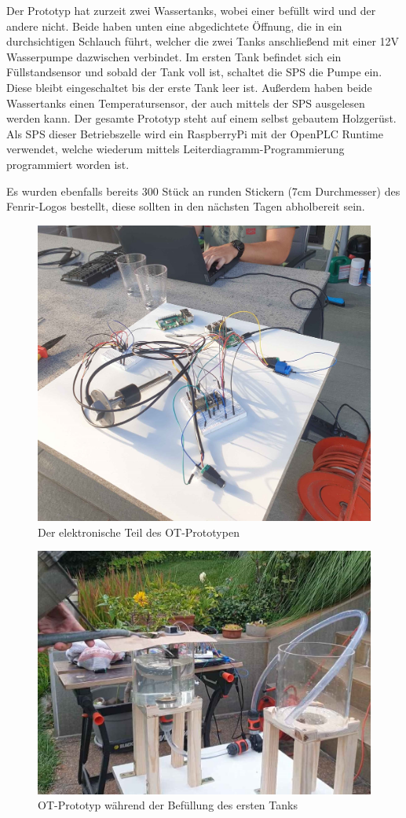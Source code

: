 \documentclass[
	headings=optiontotocandhead,%
	oneside,
	numbers=noenddot,%
	toc=flat, %
	10pt, %
	parskip=full, %
	listof=totoc, %
	listof=flat, %
	numbers=noenddot, %
	bibliography=totoc, %
	a4paper,DIV=14,
]{scrartcl}
\begin{document}
Der Prototyp hat zurzeit zwei Wassertanks, wobei einer befüllt wird und der andere nicht. Beide haben unten eine abgedichtete Öffnung, die in ein durchsichtigen Schlauch führt, welcher die zwei Tanks anschließend mit einer 12V Wasserpumpe dazwischen verbindet. Im ersten Tank befindet sich ein Füllstandsensor und sobald der Tank voll ist, schaltet die SPS die Pumpe ein. Diese bleibt eingeschaltet bis der erste Tank leer ist. Außerdem haben beide Wassertanks einen Temperatursensor, der auch mittels der SPS ausgelesen werden kann. Der gesamte Prototyp steht auf einem selbst gebautem Holzgerüst. Als SPS dieser Betriebszelle wird ein RaspberryPi mit der OpenPLC Runtime verwendet, welche wiederum mittels Leiterdiagramm-Programmierung programmiert worden ist.

Es wurden ebenfalls bereits 300 Stück an runden Stickern (7cm Durchmesser) des Fenrir-Logos bestellt, diese sollten in den nächsten Tagen abholbereit sein.

\begin{figure}[h]
	\centering
	\includegraphics[width=0.6\linewidth]{20240910_1}
	\caption[]{Der elektronische Teil des OT-Prototypen}
\end{figure}
\FloatBarrier 

\begin{figure}[h]
	\centering
	\includegraphics[width=0.6\linewidth]{20240910_2}
	\caption[]{OT-Prototyp während der Befüllung des ersten Tanks}
\end{figure}
\FloatBarrier 
\end{document}

